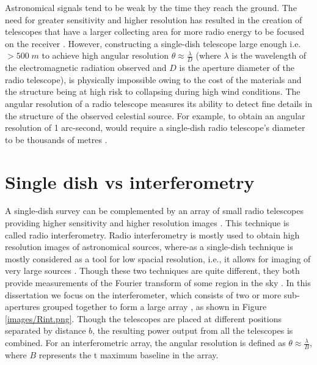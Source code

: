 Astronomical signals tend to be weak by the time they reach the ground. The need for greater sensitivity and higher resolution has resulted in the creation of telescopes that have a larger collecting area for more radio energy to be focused on the receiver \citep{verschuur2015invisible}. However, constructing a single-dish telescope large enough i.e. $>500\;m$ to achieve high angular resolution $\theta \approx\frac{\lambda}{D}$ (where $\lambda$ is the wavelength of the electromagnetic radiation observed and $D$ is the aperture diameter of the radio telescope), is physically impossible owing to the cost of the materials and the structure being at high risk to collapsing during high wind conditions. The angular resolution of a radio telescope measures its ability to detect fine details in the structure of the observed celestial source. For example, to obtain an angular resolution of 1 arc-second, would require a single-dish radio telescope's diameter to be thousands of metres \citep{verschuur2015invisible}. 

\section{Single dish vs interferometry}
\label{RvI}


A single-dish survey can be complemented by an array of small radio telescopes providing higher sensitivity and higher resolution images  \citep{thompson2001interferometry}. This technique is called radio interferometry. Radio interferometry is mostly used to obtain high resolution images of astronomical sources, where-as a single-dish technique is mostly considered as a tool for low spacial resolution, i.e., it allows for imaging of very large sources \citep{thompson2001interferometry}. Though these two techniques are quite different, they both provide measurements of the Fourier transform of  some region in the sky \citep{cornwell1988radio}. In this dissertation we focus on the interferometer, which consists of two or more sub-apertures grouped together to form a large array \citep{verschuur2015invisible}, as shown in Figure \ref{images/Rint.png}. Though the telescopes are placed at different positions separated by distance $b$, the resulting power output from all the telescopes is combined. For an interferometric array, the angular resolution is defined as  $\theta \approx\frac{\lambda}{B}$, where $B$ represents the t maximum baseline in the array. 

